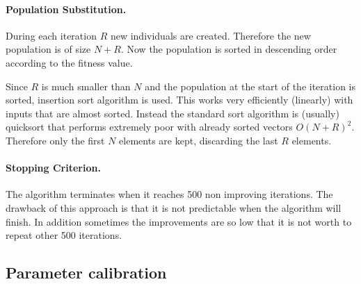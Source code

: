 \paragraph{Population Substitution.} During each iteration $R$ new individuals are created. Therefore
the new population is of size $N+R$.
Now the population is sorted in descending order according to the fitness value. 

Since $R$ is much smaller than $N$ and the population
at the start of the iteration is sorted, insertion sort algorithm
is used. This works very efficiently (linearly) with inputs that are almost sorted.
Instead the standard sort algorithm is (usually) quicksort that performs extremely poor with already sorted vectors $O(N+R)^2$.
Therefore only the first $N$ elements are kept, discarding
the last $R$ elements.

\paragraph{Stopping Criterion.} The algorithm terminates when it reaches 500 non improving iterations.
The drawback of this approach is that it is not predictable when
the algorithm will finish. In addition sometimes the improvements are so low that it is not worth to repeat other 500 iterations.



\subsection{Parameter calibration}
